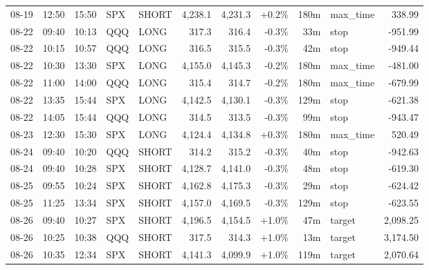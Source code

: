 \documentclass[11pt,a4paper,twoside]{article}
\begin{document}
\begin{center}
\begin{longtable}{>{\color{txtmain}}l l l l l r r r r >{\color{txtmain}}l r}
08-19 & 12:50 & 15:50 & SPX & SHORT & 4,238.1 & 4,231.3 & \textcolor{wingreen}{+0.2\%} & 180m & max\_time & \textcolor{wingreen}{338.99} \\
08-22 & 09:40 & 10:13 & QQQ & LONG & 317.3 & 316.4 & \textcolor{lossred}{-0.3\%} & 33m & stop & \textcolor{lossred}{-951.99} \\
08-22 & 10:15 & 10:57 & QQQ & LONG & 316.5 & 315.5 & \textcolor{lossred}{-0.3\%} & 42m & stop & \textcolor{lossred}{-949.44} \\
08-22 & 10:30 & 13:30 & SPX & LONG & 4,155.0 & 4,145.3 & \textcolor{lossred}{-0.2\%} & 180m & max\_time & \textcolor{lossred}{-481.00} \\
08-22 & 11:00 & 14:00 & QQQ & LONG & 315.4 & 314.7 & \textcolor{lossred}{-0.2\%} & 180m & max\_time & \textcolor{lossred}{-679.99} \\
08-22 & 13:35 & 15:44 & SPX & LONG & 4,142.5 & 4,130.1 & \textcolor{lossred}{-0.3\%} & 129m & stop & \textcolor{lossred}{-621.38} \\
08-22 & 14:05 & 15:44 & QQQ & LONG & 314.5 & 313.5 & \textcolor{lossred}{-0.3\%} & 99m & stop & \textcolor{lossred}{-943.47} \\
08-23 & 12:30 & 15:30 & SPX & LONG & 4,124.4 & 4,134.8 & \textcolor{wingreen}{+0.3\%} & 180m & max\_time & \textcolor{wingreen}{520.49} \\
08-24 & 09:40 & 10:20 & QQQ & SHORT & 314.2 & 315.2 & \textcolor{lossred}{-0.3\%} & 40m & stop & \textcolor{lossred}{-942.63} \\
08-24 & 09:40 & 10:28 & SPX & SHORT & 4,128.7 & 4,141.0 & \textcolor{lossred}{-0.3\%} & 48m & stop & \textcolor{lossred}{-619.30} \\
08-25 & 09:55 & 10:24 & SPX & SHORT & 4,162.8 & 4,175.3 & \textcolor{lossred}{-0.3\%} & 29m & stop & \textcolor{lossred}{-624.42} \\
08-25 & 11:25 & 13:34 & SPX & SHORT & 4,157.0 & 4,169.5 & \textcolor{lossred}{-0.3\%} & 129m & stop & \textcolor{lossred}{-623.55} \\
08-26 & 09:40 & 10:27 & SPX & SHORT & 4,196.5 & 4,154.5 & \textcolor{wingreen}{+1.0\%} & 47m & target & \textcolor{wingreen}{2,098.25} \\
08-26 & 10:25 & 10:38 & QQQ & SHORT & 317.5 & 314.3 & \textcolor{wingreen}{+1.0\%} & 13m & target & \textcolor{wingreen}{3,174.50} \\
08-26 & 10:35 & 12:34 & SPX & SHORT & 4,141.3 & 4,099.9 & \textcolor{wingreen}{+1.0\%} & 119m & target & \textcolor{wingreen}{2,070.64} \\

\end{longtable}
\end{center}
\end{document}
